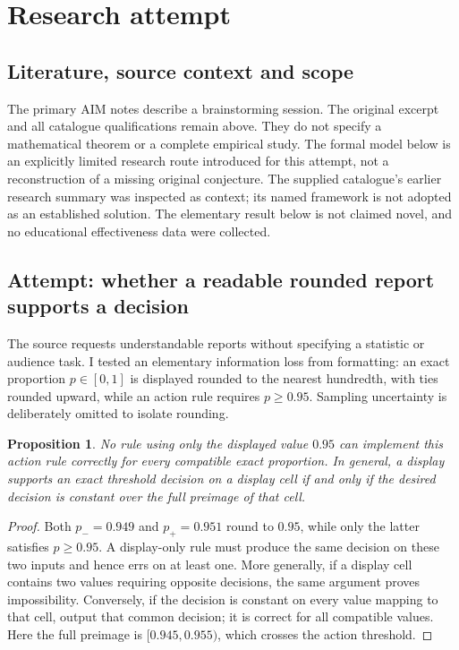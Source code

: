 \documentclass[11pt]{article}
\newtheorem{proposition}{Proposition}
\begin{document}
\section{Research attempt}
\subsection{Literature, source context and scope}
The primary AIM notes describe a brainstorming session. The original excerpt and all catalogue qualifications remain above. They do not specify a mathematical theorem or a complete empirical study. The formal model below is an explicitly limited research route introduced for this attempt, not a reconstruction of a missing original conjecture. The supplied catalogue's earlier research summary was inspected as context; its named framework is not adopted as an established solution. The elementary result below is not claimed novel, and no educational effectiveness data were collected.

\subsection{Attempt: whether a readable rounded report supports a decision}
The source requests understandable reports without specifying a statistic or audience task. I tested an elementary information loss from formatting: an exact proportion $p\in[0,1]$ is displayed rounded to the nearest hundredth, with ties rounded upward, while an action rule requires $p\ge0.95$. Sampling uncertainty is deliberately omitted to isolate rounding.
\begin{proposition}
No rule using only the displayed value $0.95$ can implement this action rule correctly for every compatible exact proportion. In general, a display supports an exact threshold decision on a display cell if and only if the desired decision is constant over the full preimage of that cell.
\end{proposition}
\begin{proof}
Both $p_-=0.949$ and $p_+=0.951$ round to $0.95$, while only the latter satisfies $p\ge0.95$. A display-only rule must produce the same decision on these two inputs and hence errs on at least one. More generally, if a display cell contains two values requiring opposite decisions, the same argument proves impossibility. Conversely, if the decision is constant on every value mapping to that cell, output that common decision; it is correct for all compatible values. Here the full preimage is $[0.945,0.955)$, which crosses the action threshold.
\end{proof}
\end{document}
